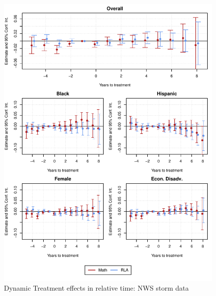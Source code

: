\begin{figure}[!h]
	\centering
	\includegraphics[scale=1]{"../Code & Data/ResultsPlotStorm.pdf"}
	\caption{Dynamic Treatment effects in relative time: NWS storm data}
	\label{ResultsPlotStorm}
\end{figure}







